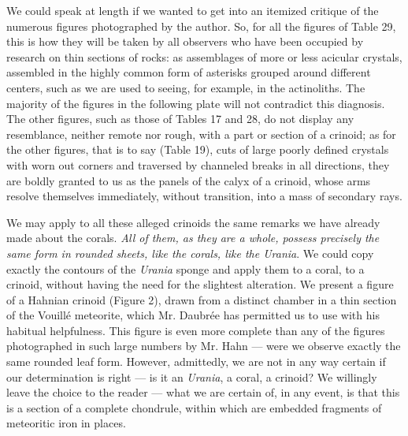 \documentclass[a4paper, 12pt, oneside]{article}
\begin{document}
We could speak at length if we wanted to get into an itemized critique of the numerous figures photographed by the author. So, for all the figures of Table 29, this is how they will be taken by all observers who have been occupied by research on thin sections of rocks: as assemblages of more or less acicular crystals, assembled in the highly common form of asterisks grouped around different centers, such as we are used to seeing, for example, in the actinoliths. The majority of the figures in the following plate will not contradict this diagnosis. The other figures, such as those of Tables 17 and 28, do not display any resemblance, neither remote nor rough, with a part or section of a crinoid; as for the other figures, that is to say (Table 19), cuts of large poorly defined crystals with worn out corners and traversed by channeled breaks in all directions, they are boldly granted to us as the panels of the calyx of a crinoid, whose arms resolve themselves immediately, without transition, into a mass of secondary rays.

We may apply to all these alleged crinoids the same remarks we have already made about the corals. \emph{All of them, as they are a whole, possess precisely the same form in rounded sheets, like the corals, like the Urania}. We could copy exactly the contours of the \emph{Urania} sponge and apply them to a coral, to a crinoid, without having the need for the slightest alteration. We present a figure of a Hahnian crinoid (Figure 2), drawn from a distinct chamber in a thin section of the Vouillé meteorite, which Mr. Daubrée has permitted us to use with his habitual helpfulness. This figure is even more complete than any of the figures photographed in such large numbers by Mr. Hahn --- were we observe exactly the same rounded leaf form. However, admittedly, we are not in any way certain if our determination is right --- is it an \emph{Urania}, a coral, a crinoid? We willingly leave the choice to the reader --- what we are certain of, in any event, is that this is a section of a complete chondrule, within which are embedded fragments of meteoritic iron in places.
\end{document}
